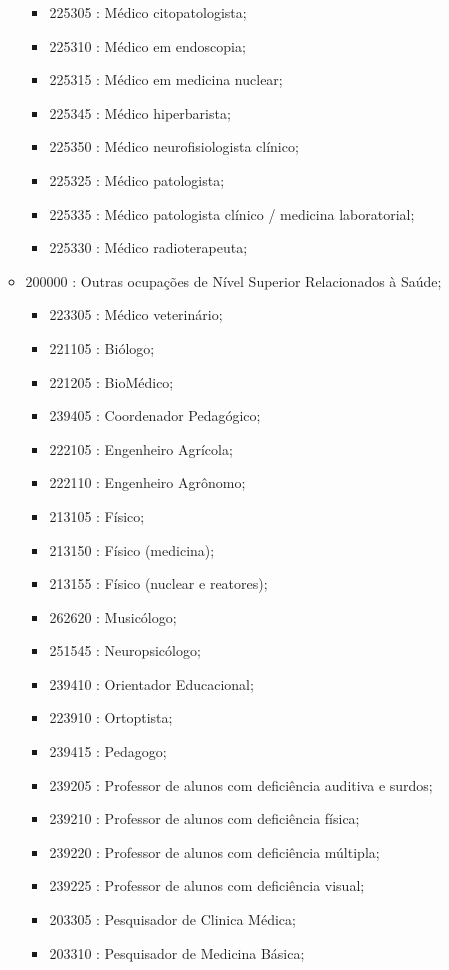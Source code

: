 \begin{itemize}
\begin{itemize}
\begin{itemize}
      \item 225305 : Médico citopatologista;
      \item 225310 : Médico em endoscopia;
      \item 225315 : Médico em medicina nuclear;
      \item 225345 : Médico hiperbarista;
      \item 225350 : Médico neurofisiologista clínico;
      \item 225325 : Médico patologista;
      \item 225335 : Médico patologista clínico / medicina laboratorial;
      \item 225330 : Médico radioterapeuta;
    \end{itemize}
    \item 200000 : Outras ocupações de Nível Superior Relacionados à Saúde;
    \begin{itemize}
      \item 223305 : Médico veterinário;
      \item 221105 : Biólogo;
      \item 221205 : BioMédico;
      \item 239405 : Coordenador Pedagógico;
      \item 222105 : Engenheiro Agrícola;
      \item 222110 : Engenheiro Agrônomo;
      \item 213105 : Físico;
      \item 213150 : Físico (medicina);
      \item 213155 : Físico (nuclear e reatores);
      \item 262620 : Musicólogo;
      \item 251545 : Neuropsicólogo;
      \item 239410 : Orientador Educacional;
      \item 223910 : Ortoptista;
      \item 239415 : Pedagogo;
      \item 239205 : Professor de alunos com deficiência auditiva e surdos;
      \item 239210 : Professor de alunos com deficiência física;
      \item 239220 : Professor de alunos com deficiência múltipla;
      \item 239225 : Professor de alunos com deficiência visual;
      \item 203305 : Pesquisador de Clinica Médica;
      \item 203310 : Pesquisador de Medicina Básica;

\end{itemize}
\end{itemize}
\end{itemize}
